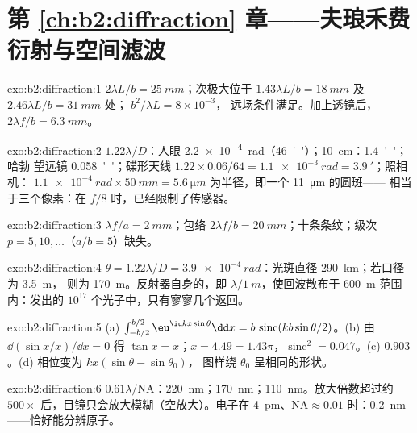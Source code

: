 \section*{第 \ref{ch:b2:diffraction} 章——夫琅禾费衍射与空间滤波}

\begin{solution}{exo:b2:diffraction:1}
$2\lambda L/b = \qty{25}{mm}$；次极大位于 $1.43\lambda L/b = \qty{18}{mm}$ 及
$2.46\lambda L/b = \qty{31}{mm}$ 处； $b^2/\lambda L = 8 \times 10^{-3}$，
远场条件满足。加上透镜后，$2\lambda f/b = \qty{6.3}{mm}$。
\end{solution}

\begin{solution}{exo:b2:diffraction:2}
$1.22\lambda/D$：人眼 \qty{2.2e-4}{rad}（\qty{46}{''}）；\qty{10}{cm}：\qty{1.4}{''}；哈勃
望远镜 \qty{0.058}{''}；碟形天线 $1.22 \times 0.06/64 = \qty{1.1e-3}{rad} = \qty{3.9}{'}$；照相机：
$\qty{1.1e-4}{rad} \times \qty{50}{mm} = \qty{5.6}{\micro m}$ 为半径，即一个 \qty{11}{\micro m} 的圆斑——
相当于三个像素：在 $f/8$ 时，已经限制了传感器。
\end{solution}

\begin{solution}{exo:b2:diffraction:3}
$\lambda f/a = \qty{2}{mm}$；包络 $2\lambda f/b = \qty{20}{mm}$；十条条纹；级次
$p = 5, 10, \dots$（$a/b = 5$）缺失。
\end{solution}

\begin{solution}{exo:b2:diffraction:4}
$\theta = 1.22\lambda/D = \qty{3.9e-4}{rad}$：光斑直径 \qty{290}{km}；若口径为 \qty{3.5}{m}，
则为 \qty{170}{m}。反射器自身的，即 $\lambda/\qty{1}{m}$，使回波散布于
\qty{600}{m} 范围内：发出的 $10^{17}$ 个光子中，只有寥寥几个返回。
\end{solution}

\begin{solution}{exo:b2:diffraction:5}
(a) $\int_{-b/2}^{b/2}\eu^{\iu kx\sin\theta}\dd x = b\,\operatorname{sinc}(kb\sin\theta/2)$。(b)
由 $\dd(\sin x/x)/\dd x = 0$ 得 $\tan x = x$；$x = 4.49 = 1.43\pi$，$\operatorname{sinc}^2 =
0.047$。(c) $0.903$。(d) 相位变为 $kx(\sin\theta - \sin\theta_0)$，
图样绕 $\theta_0$ 呈相同的形状。
\end{solution}

\begin{solution}{exo:b2:diffraction:6}
$0.61\lambda/\mathrm{NA}$：\qty{220}{nm}；\qty{170}{nm}；\qty{110}{nm}。放大倍数超过约 $500\times$
后，目镜只会放大模糊（空放大）。电子在
\qty{4}{pm}、$\mathrm{NA} \approx 0.01$ 时：\qty{0.2}{nm}——恰好能分辨原子。
\end{solution}

